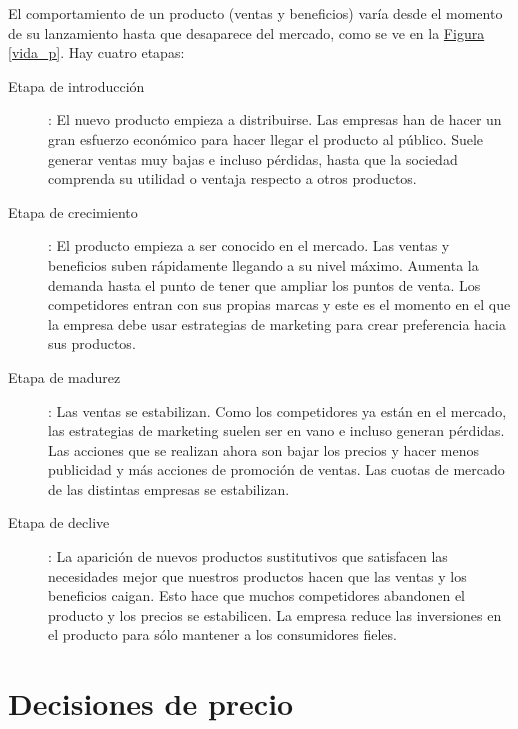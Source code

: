 \documentclass[10pt,a4paper,spanish]{report}
\begin{document}
			El comportamiento de un producto (ventas y beneficios) varía desde el momento de su lanzamiento hasta que desaparece del mercado, como se ve en la \hyperref[vida_p]{Figura \ref*{vida_p}}. Hay cuatro etapas:

			\begin{description}
				\item[Etapa de introducción]: El nuevo producto empieza a distribuirse. Las empresas han de hacer un gran esfuerzo económico para hacer llegar el producto al público. Suele generar ventas muy bajas e incluso pérdidas, hasta que la sociedad comprenda su utilidad o ventaja respecto a otros productos.

				\item[Etapa de crecimiento]: El producto empieza a ser conocido en el mercado. Las ventas y beneficios suben rápidamente llegando a su nivel máximo. Aumenta la demanda hasta el punto de tener que ampliar los puntos de venta. Los competidores entran con sus propias marcas y este es el momento en el que la empresa debe usar estrategias de marketing para crear preferencia hacia sus productos.

				\item[Etapa de madurez]: Las ventas se estabilizan. Como los competidores ya están en el mercado, las estrategias de marketing suelen ser en vano e incluso generan pérdidas. Las acciones que se realizan ahora son bajar los precios y hacer menos publicidad y más acciones de promoción de ventas. Las cuotas de mercado de las distintas empresas se estabilizan.

				\item[Etapa de declive]: La aparición de nuevos productos sustitutivos que satisfacen las necesidades mejor que nuestros productos hacen que las ventas y los beneficios caigan. Esto hace que muchos competidores abandonen el producto y los precios se estabilicen. La empresa reduce las inversiones en el producto para sólo mantener a los consumidores fieles.
			\end{description}

	\section{\textcolor[rgb]{0.1,0.2,0.4}Decisiones de precio}
\end{document}
